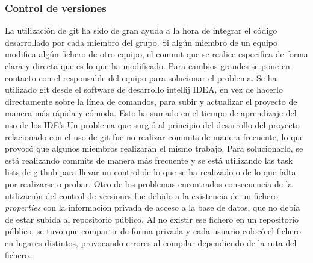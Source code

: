 \subsubsection{Control de versiones}
La utilización de git ha sido de gran ayuda a la hora de integrar el código desarrollado por cada miembro del grupo. Si algún miembro de un equipo modifica algún fichero de otro equipo, el commit que se realice especifica de forma clara y directa que es lo que ha modificado. Para cambios grandes se pone en contacto con el responsable del equipo para solucionar el problema. Se ha utilizado git desde el software de desarrollo intellij IDEA, en vez de hacerlo directamente sobre la línea de comandos, para subir y actualizar el proyecto de manera más rápida y cómoda. Esto ha sumado en el tiempo de aprendizaje del uso de los IDE’s.Un problema que surgió al principio del desarrollo del proyecto relacionado con el uso de git fue no realizar commits de manera frecuente, lo que provocó que algunos miembros realizarán el mismo trabajo. Para solucionarlo, se está realizando commits de manera más frecuente y se está utilizando las task lists de github para llevar un control de lo que se ha realizado o de lo que falta por realizarse o probar. Otro de los problemas encontrados consecuencia de la utilización del control de versiones fue debido a la existencia de un fichero \textit{properties} con la información privada de acceso a la base de datos, que no debía de estar subida al repositorio público. Al no existir ese fichero en un repositorio público, se tuvo que compartir de forma privada y cada usuario colocó el fichero en lugares distintos, provocando errores al compilar dependiendo de la ruta del fichero.


